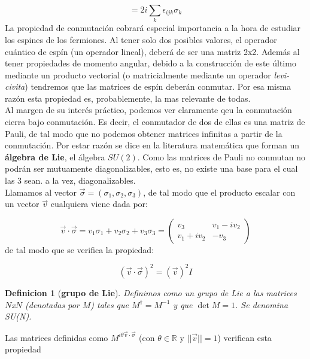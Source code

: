 \documentclass[12pt]{book}
\numberwithin{equation}{chapter}
\numberwithin{figure}{chapter}
\newtheorem{definition}{Definicion}[section]
\begin{document}
\begin{equation}
[\sigma_i, \sigma_j] = 2 i \sum_{k} \epsilon_{ijk} \sigma_k
\end{equation}
La propiedad de conmutación cobrará especial importancia a la hora de estudiar los espines de los fermiones. Al tener solo dos posibles valores, el operador cuántico de espín (un operador lineal), deberá de ser una matriz 2x2. Además al tener propiedades de momento angular, debido a la construcción de este último mediante un producto vectorial (o matricialmente mediante un operador \textit{levi-civita}) tendremos que las matrices de espín deberán conmutar. Por esa misma razón esta propiedad es, probablemente, la mas relevante de todas. \\

Al margen de su interés práctico, podemos ver claramente qeu la conmutación cierra bajo conmutación. Es decir, el conmutador de dos de ellas es una matriz de Pauli, de tal modo que no podemos obtener matrices infinitas a partir de la conmutación. Por estar razón se dice en la literatura matemática que forman un \textbf{álgebra de Lie}, el álgebra $SU(2)$. Como las matrices de Pauli no conmutan no podrán ser mutuamente diagonalizables, esto es, no existe una base para el cual las 3 sean. a la vez, diagonalizables. \\

Llamamos al vector $\vec{\sigma} = (\sigma_1,\sigma_2,\sigma_3)$, de tal modo que el producto escalar con un vector $\vec{v}$ cualquiera viene dada por:

\begin{equation}
\vec{v} \cdot \vec{\sigma} = v_1 \sigma_1 + v_2 \sigma_2 + v_3 \sigma_3 = \begin{pmatrix}
v_3 & v_1 - i v_2 \\
v_1 + i v_2 & - v_3
\end{pmatrix}
\end{equation}
de tal modo que se verifica la propiedad:

\begin{equation}
(\vec{v} \cdot \vec{\sigma})^2 = (\vec{v})^2  I
\end{equation}

\begin{definition}[\textbf{grupo de Lie}]
Definimos como un grupo de Lie a las matrices $N$x$N$ (denotadas por $M$) tales que $M^\dagger = M^{-1}$ y que $\det M = 1$. Se denomina SU(N). 
\end{definition}

Las matrices definidas como $M^{i \theta \vec{v} \cdot \vec{\sigma}}$ (con $\theta \in \mathbb{R}$ y $||\vec{v}||=1$) verifican esta propiedad
\end{document}
